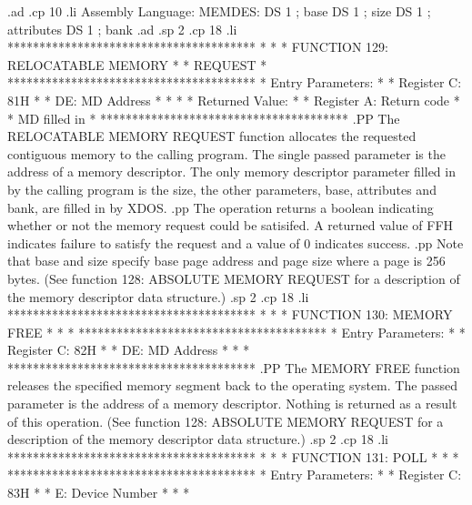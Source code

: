 .ad
.cp 10
.li
         Assembly Language:
             MEMDES:
                     DS      1       ; base
                     DS      1       ; size
                     DS      1       ; attributes
                     DS      1       ; bank
.ad
.sp 2
.cp 18
.li
***************************************
*                                     *
*  FUNCTION 129:  RELOCATABLE MEMORY  *
*                 REQUEST             *
***************************************
*  Entry Parameters:                  *
*      Register   C:  81H             *
*                DE:  MD Address      *
*                                     *
*  Returned   Value:                  *
*      Register   A:  Return code     *
*      MD filled in                   *
***************************************
.PP
The RELOCATABLE MEMORY REQUEST function allocates
the requested contiguous memory to the calling program.  The
single passed parameter is the address of a memory descriptor.  The
only memory descriptor parameter filled in by the calling program is
the
size, the other parameters, base, attributes and bank, are filled in by
XDOS.
.pp
The operation returns a boolean indicating whether or not the memory
request could be satisifed.
A returned value of FFH indicates failure to
satisfy the request and a value of 0 indicates success.
.pp
Note that base and size specify base page address and page size where
a page is 256 bytes.
(See function 128: ABSOLUTE MEMORY REQUEST  for a description of
the memory descriptor data structure.)
.sp 2
.cp 18
.li
***************************************
*                                     *
*  FUNCTION 130:  MEMORY FREE         *
*                                     *
***************************************
*  Entry Parameters:                  *
*      Register   C:  82H             *
*                DE:  MD Address      *
*                                     *
***************************************
.PP
The MEMORY FREE function releases the
specified memory segment back to the operating system.  The passed
parameter is the address of a memory descriptor.
Nothing is returned as
a result of this operation.
(See function 128: ABSOLUTE MEMORY REQUEST  for a description of
the memory descriptor data structure.)
.sp 2
.cp 18
.li
***************************************
*                                     *
*  FUNCTION 131:  POLL                *
*                                     *
***************************************
*  Entry Parameters:                  *
*      Register   C:  83H             *
*                 E:  Device Number   *
*                                     *
